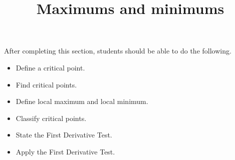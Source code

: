 \documentclass{ximera}
\title{Maximums and minimums}
\begin{document}
\begin{abstract}
\end{abstract}

\maketitle

\begin{sectionOutcomes}

After completing this section, students should be able to do the following.

\begin{itemize}
	\item Define a critical point.
	\item Find critical points.
	\item Define local maximum and local minimum.
	\item Classify critical points.
	\item State the First Derivative Test.
	\item Apply the First Derivative Test.
\end{itemize}

\end{sectionOutcomes}
\end{document}
